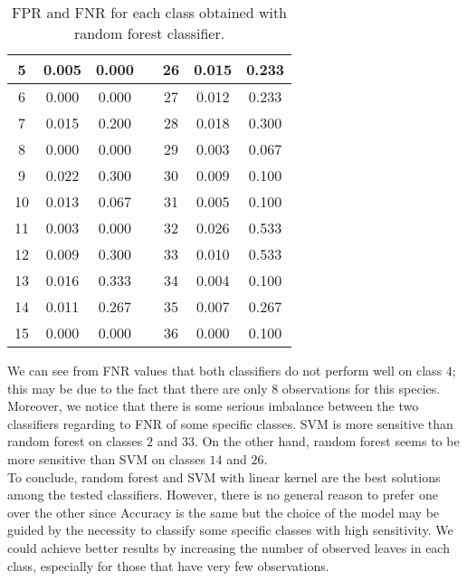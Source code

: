 \documentclass{article}
\begin{document}
\begin{table}[h]
\begin{minipage}[]{7cm}
\begin{tabular}{ |c|c|c|c|c|c|c| }
\hline
 5 &  0.005 & 0.000 & & 26 & 0.015 & 0.233 \\ 
\hline
 6 & 0.000 & 0.000 & & 27 & 0.012 & 0.233 \\ 
\hline
 7 & 0.015 & 0.200 & & 28 & 0.018 & 0.300\\ 
\hline
 8 & 0.000 & 0.000 & & 29 & 0.003 & 0.067\\ 
\hline
 9 & 0.022 & 0.300 & & 30 & 0.009& 0.100\\ 
\hline
 10 & 0.013 & 0.067 & & 31 &  0.005 & 0.100\\ 
\hline
 11 & 0.003 & 0.000 & & 32 & 0.026 & 0.533\\ 
\hline
 12 & 0.009 & 0.300 & & 33 & 0.010 & 0.533\\ 
\hline
 13 & 0.016 & 0.333 & & 34 & 0.004 & 0.100\\ 
\hline
 14 & 0.011 & 0.267 & & 35 & 0.007 & 0.267\\ 
\hline
 15 & 0.000 & 0.000 & & 36 & 0.000 & 0.100\\ 
\hline
\end{tabular}
\caption{FPR and FNR for each class obtained with random forest classifier.}\label{table4}
\end{minipage}

\end{table}

We can see from FNR values that both classifiers do not perform well on class $4$; this may be due to the fact that there are only $8$ observations for this species. Moreover, we notice that there is some serious imbalance between the two classifiers regarding to FNR of some specific classes. SVM is more sensitive than random forest on classes $2$ and $33$. On the other hand, random forest seems to be more sensitive than SVM on classes $14$ and $26$. %
\\To conclude, random forest and SVM with linear kernel are the best solutions among the tested classifiers. However, there is no general reason to prefer one over the other since Accuracy is the same but the choice of the model may be guided by the necessity to classify some specific classes with high sensitivity.
We could achieve better results by increasing the number of observed leaves in each class, especially for those that have very few observations.


\newpage


\end{document}
